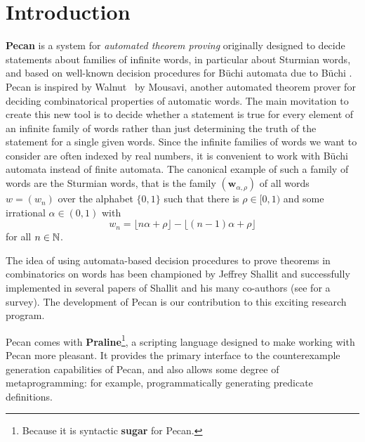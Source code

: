 \section{Introduction}

\textbf{Pecan} is a system for \emph{automated theorem proving} originally designed to decide statements about families of infinite words, in particular about Sturmian words, and based on well-known decision procedures for B\"uchi automata due to B\"uchi \cite{Buechi}. Pecan is inspired by Walnut~\cite{walnut} by Mousavi, another automated theorem prover for deciding combinatorical properties of automatic words. The main movitation to create this new tool is to decide whether a statement is true for every element of an infinite family of words rather than just determining the truth of the statement for a single given words. Since the infinite families of words we want to consider are often indexed by real numbers, it is convenient to work with B\"uchi automata instead of finite automata. The canonical example of such a family of words are the Sturmian words, that is the family $(\mathbf{w}_{\alpha,\rho})$ of all words $w=(w_n)$ over the alphabet $\{0,1\}$ such that there is $\rho \in [ 0,1 )$  and some irrational $\alpha \in (0,1)$ with
\[
w_{n}=\lfloor n\alpha +\rho\rfloor -\lfloor (n-1)\alpha +\rho\rfloor
\]
for all $n\in \mathbb{N}$. 

The idea of using automata-based decision procedures to prove theorems in combinatorics on words has been championed by Jeffrey Shallit and successfully implemented in several papers of Shallit and his many co-authors (see \cite{Shallit-survey} for a survey). The development of Pecan is our contribution to this exciting research program.



Pecan comes with \textbf{Praline}\footnote{Because it is syntactic \textbf{sugar} for Pecan.}, a scripting language designed to make working with Pecan more pleasant.
It provides the primary interface to the counterexample generation capabilities of Pecan, and also allows some degree of metaprogramming: for example, programmatically generating predicate definitions.

